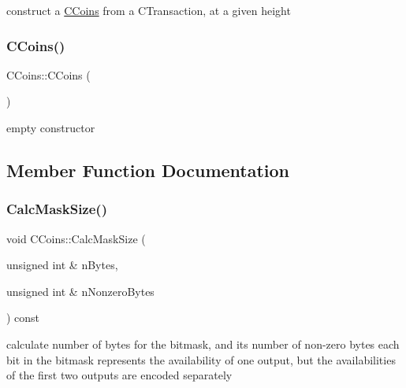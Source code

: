 construct a \mbox{\hyperlink{class_c_coins}{C\+Coins}} from a C\+Transaction, at a given height 

\mbox{\label{class_c_coins_a543757065d6c77d23953a33eecb31a46}} 
\subsubsection{\texorpdfstring{C\+Coins()}{CCoins()}\hspace{0.1cm}{\footnotesize\ttfamily [2/2]}}
{\footnotesize\ttfamily C\+Coins\+::\+C\+Coins (\begin{DoxyParamCaption}{ }\end{DoxyParamCaption})\hspace{0.3cm}{\ttfamily [inline]}}



empty constructor 



\subsection{Member Function Documentation}
\mbox{\label{class_c_coins_a7fc7a42f2b5d7cf7476bfe3e10141e18}} 
\subsubsection{\texorpdfstring{Calc\+Mask\+Size()}{CalcMaskSize()}}
{\footnotesize\ttfamily void C\+Coins\+::\+Calc\+Mask\+Size (\begin{DoxyParamCaption}\item[{unsigned int \&}]{n\+Bytes,  }\item[{unsigned int \&}]{n\+Nonzero\+Bytes }\end{DoxyParamCaption}) const}

calculate number of bytes for the bitmask, and its number of non-\/zero bytes each bit in the bitmask represents the availability of one output, but the availabilities of the first two outputs are encoded separately \mbox{\label{class_c_coins_a7cfa2efc07f4d35785c9c75caa8bddcb}} 
